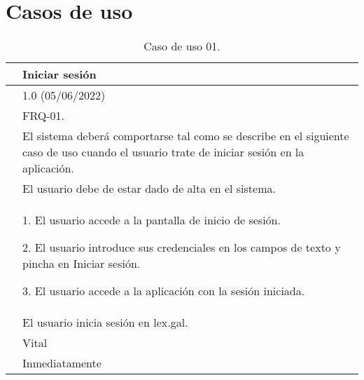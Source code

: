 \section{Casos de uso}
\label{APCasosUso}

\begin{table}[H]
\begin{center}
\begin{tabular}{|p{3cm}|p{10cm}|} \hline
\centering {\bf UC-01} & Iniciar sesión  \\ \hline\hline
\centering {\bf Versión} & 1.0 (05/06/2022) \\ \hline
\centering {\bf Dependencias} &  FRQ-01. \\ \hline
\centering {\bf Descripción} &  El sistema deberá comportarse tal como se describe en el siguiente caso de uso cuando el usuario trate de iniciar sesión en la aplicación. \\ \hline
\centering {\bf Precondición} &  El usuario debe de estar dado de alta en el sistema. \\ \hline
\centering {\bf Secuencia normal} &  
1. El usuario accede a la pantalla de inicio de sesión.

2. El usuario introduce sus credenciales en los campos de texto y pincha en Iniciar sesión.

3. El usuario accede a la aplicación con la sesión iniciada.
\\ \hline
\centering {\bf Postcondición} &  El usuario inicia sesión en lex.gal. \\ \hline
\centering {\bf Importancia} & Vital \\ \hline
\centering {\bf Urgencia} & Inmediatamente \\ \hline
\end{tabular}
\caption{Caso de uso 01.}
\label{enlaceUC1}
\end{center}
\end{table}


